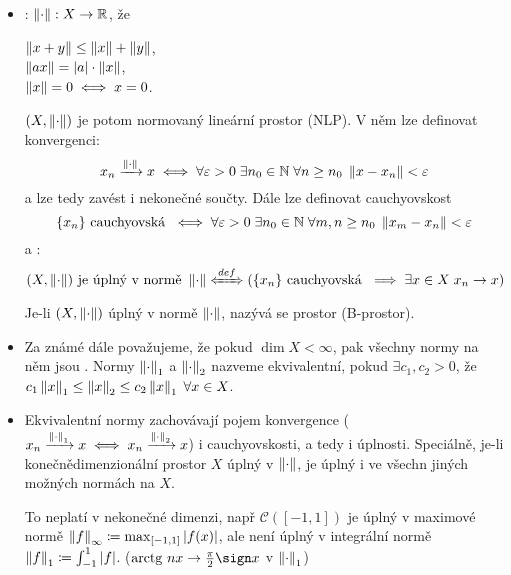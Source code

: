 \begin{itemize}
    \item {}: \hspace{1em}
    $\left\lVert\cdot\right\rVert: X \to \mathbb{R}$, že \parbox[t]{20em}{
        $\left\lVert x+y\right\rVert \leq \left\lVert x\right\rVert + \left\lVert y\right\rVert$, \\[3pt]
        $\left\lVert ax\right\rVert = |a| \cdot \left\lVert x\right\rVert$, \\[3pt]
        $\left\lVert x\right\rVert = 0 \iff x = 0$.
    }
    
    $(X, \left\lVert\cdot\right\rVert)$ je potom normovaný lineární prostor (NLP). V něm lze definovat konvergenci:
    $$
        x_n \xrightarrow{\left\lVert\cdot\right\rVert} x
        \iff
        \forall \varepsilon > 0 \;
        \exists n_0 \in \mathbb{N} \;
        \forall n \geq n_0 \;
        \left\lVert x - x_n\right\rVert < \varepsilon
    $$
    a lze tedy zavést i nekonečné součty.
    Dále lze definovat cauchyovskost
    $$
        \{ x_n \} \text{ cauchyovská }
        \iff
        \forall \varepsilon > 0 \;
        \exists n_0 \in \mathbb{N} \;
        \forall m,n \geq n_0 \;
        \left\lVert x_m - x_n\right\rVert < \varepsilon
    $$
    a :
    $$
        (X, \norm{\cdot}) \text{ je úplný v normě } \norm{\cdot}
        \xLeftrightarrow{def}
        \left(
        \{ x_n \} \text{ cauchyovská }
        \implies
        \exists x \in X \; x_n \to x
        \right)
    $$
    Je-li $(X, \left\lVert\cdot\right\rVert)$ úplný v normě $\left\lVert\cdot\right\rVert$, nazývá se  prostor (B-prostor).
    
    \item Za známé dále považujeme, že pokud $\dim X < \infty$, pak všechny normy na něm jsou . Normy $\left\lVert\cdot\right\rVert_1$ a $\left\lVert\cdot\right\rVert_2$ nazveme ekvivalentní, pokud $\exists c_1, c_2 > 0$, že
    $c_1 \left\lVert x\right\rVert_1 \leq \left\lVert x\right\rVert_2 \leq c_2 \left\lVert x\right\rVert_1 \; \forall x \in X$.
    
    \item Ekvivalentní normy zachovávají pojem konvergence ($x_n \xrightarrow{\left\lVert\cdot\right\rVert_1} x \iff x_n \xrightarrow{\left\lVert\cdot\right\rVert_2} x$) i cauchyovskosti, a tedy i úplnosti. Speciálně, je-li konečnědimenzionální prostor $X$ úplný v $\left\lVert\cdot\right\rVert$, je úplný i ve všechn jiných možných normách na $X$.
    
    To neplatí v nekonečné dimenzi, např $\mathcal{C}([-1, 1])$ je úplný v maximové normě $\left\lVert f\right\rVert_\infty \coloneqq \max_{[-1, 1]} |f(x)|$, ale není úplný v integrální normě $\left\lVert f\right\rVert_1 \coloneqq \int_{-1}^1 |f|$. \big($\arctg nx \to \frac{\pi}{2} \sign x$ v $\left\lVert\cdot\right\rVert_1$\big)
    

\end{itemize}

